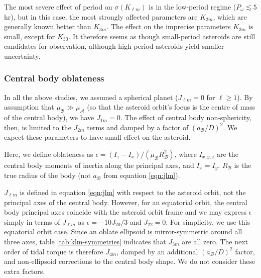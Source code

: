 \documentclass[fleqn,usenatbib]{mnras}
\begin{document}
The most severe effect of period on $\sigma(K_{\ell m})$ is in the low-period regime ($P_\omega \lesssim 5$ hr), but in this case, the most strongly affected parameters are $K_{2m}$, which are generally known better than $K_{3m}$. The effect on the imprecise parameters $K_{3m}$ is small, except for $K_{30}$. It therefore seems as though small-period asteroids are still candidates for observation, although high-period asteroids yield smaller uncertainty.


\subsubsection{Central body oblateness}
\label{sec:scan-oblateness}

In all the above studies, we assumed a spherical planet ($J_{\ell m} = 0$ for $\ell \geq 1$). By assumption that $\mu_\mathcal{B} \gg \mu_\mathcal{A}$ (so that the asteroid orbit's focus is the centre of mass of the central body), we have $J_{1m} = 0$. The effect of central body non-sphericity, then, is limited to the $J_{2m}$ terms and damped by a factor of $(a_\mathcal{B} / D)^2$. We expect these parameters to have small effect on the asteroid.

Here, we define oblateness as $\epsilon = (I_z - I_x)/(\mu_\mathcal{B} R_\mathcal{B}^2)$, where $I_{x,y,z}$ are the central body moments of inertia along the principal axes, and $I_x = I_y$. $R_\mathcal{B}$ is the true radius of the body (not $a_\mathcal{B}$ from equation \ref{eqn:jlm}). 

$J_{\ell m}$ is defined in equation \ref{eqn:jlm} with respect to the asteroid orbit, not the principal axes of the central body. However, for an equatorial orbit, the central body principal axes coincide with the asteroid orbit frame and we may express $\epsilon$ simply in terms of $J_{\ell m}$ as $\epsilon = -10J_{20}/3$ and $J_{22} = 0$. For simplicity, we use this equatorial orbit case. Since an oblate ellipsoid is mirror-symmetric around all three axes, table \ref{tab:klm-symmetries} indicates that $J_{3m}$ are all zero. The next order of tidal torque is therefore $J_{4m}$, damped by an additional $(a_\mathcal{B}/D)^2$ factor, and non-ellipsoid corrections to the central body shape. We do not consider these extra factors.
\end{document}
